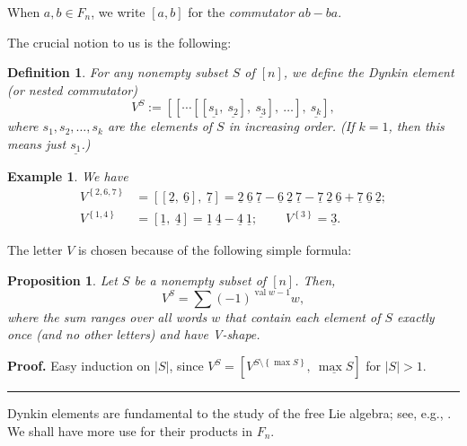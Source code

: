 \documentclass[submission]{FPSAC2026}
\newtheorem{defn}{Definition}
\newtheorem{proposition}{Proposition}
\newtheorem{example}{Example}
\newenvironment{proof}[1][Proof]{\noindent\textbf{#1.} }{\ \rule{0.5em}{0.5em}}
\begin{document}
When $a,b\in F_{n}$, we write $\left[  a,b\right]  $ for the \emph{commutator}
$ab-ba$.

The crucial notion to us is the following:

\begin{defn}
\label{def.dynkin}For any nonempty subset $S$ of $\left[  n\right]  $, we
define the \emph{Dynkin element} (or \emph{nested commutator})
\[
V^{S}:=\left[  \left[  \cdots\left[  \left[  \underline{s_{1}}%
,\ \underline{s_{2}}\right]  ,\ \underline{s_{3}}\right]  ,\ \ldots\right]
,\ \underline{s_{k}}\right]  ,
\]
where $s_{1},s_{2},\ldots,s_{k}$ are the elements of $S$ in increasing order.
(If $k=1$, then this means just $\underline{s_{1}}$.)
\end{defn}

\begin{example}
We have
\begin{align*}
V^{\left\{  2,6,7\right\}  }  & =\left[  \left[  \underline{2},\ \underline{6}%
\right]  ,\ \underline{7}\right]  =\underline{2}\ \underline{6}\ \underline{7}%
-\underline{6}\ \underline{2}\ \underline{7}-\underline{7}\ \underline{2}%
\ \underline{6}+\underline{7}\ \underline{6}\ \underline{2};\\
V^{\left\{  1,4\right\}  }  & =\left[  \underline{1},\ \underline{4}\right]
=\underline{1}\ \underline{4}-\underline{4}\ \underline{1}%
;\ \ \ \ \ \ \ \ \ \ V^{\left\{  3\right\}  }=\underline{3}.
\end{align*}

\end{example}

The letter $V$ is chosen because of the following simple formula:

\begin{proposition}
\label{prop.dynkin.Vsh}
Let $S$ be a nonempty subset of $\left[  n\right]  $.
Then,
\[
V^{S}=\sum\left(  -1\right)  ^{\operatorname*{val}w-1}w,
\]
where the sum ranges over all words $w$ that contain each element of $S$ exactly
once (and no other letters) and have V-shape.
\end{proposition}

\begin{proof}
Easy induction on $\left\vert S\right\vert $, since $V^{S}=\left[
V^{S\setminus\left\{  \max S\right\}  },\ \underline{\max S}\right]  $ for
$\left\vert S\right\vert >1$.
\end{proof}

Dynkin elements are fundamental to the study of the free Lie algebra; see,
e.g., \cite[(8.4.2)]{Reutenauer1993}. We shall have more use for their
products in $F_n$.
\end{document}
